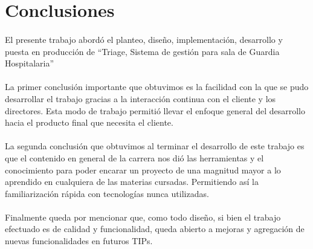 \section{Conclusiones}

\paragraph{}
El presente trabajo abordó el planteo, diseño, implementación, desarrollo y puesta en producción de ``Triage, Sistema de gestión para 
sala de Guardia Hospitalaria''

\paragraph{}
La primer conclusión importante que obtuvimos es la facilidad con la que se pudo desarrollar el trabajo gracias a la interacción continua con el cliente y los directores. Esta modo de trabajo permitió llevar el enfoque general del desarrollo hacia el producto final que necesita el cliente. 

\paragraph{}
La segunda conclusión que obtuvimos al terminar el desarrollo de este trabajo es que el contenido en general de la carrera nos dió las herramientas y el conocimiento para poder encarar un proyecto de una magnitud mayor a lo aprendido en cualquiera de las materias cursadas. Permitiendo así la familiarización rápida con tecnologías nunca utilizadas.

\paragraph{}
Finalmente queda por mencionar que, como todo diseño, si bien el trabajo efectuado es de calidad y funcionalidad, queda abierto a mejoras y agregación de nuevas funcionalidades en futuros TIPs.

